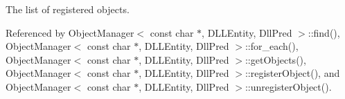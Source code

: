 The list of registered objects. 



Referenced by ObjectManager$<$ const char $\ast$, DLLEntity, DllPred $>$::find(), ObjectManager$<$ const char $\ast$, DLLEntity, DllPred $>$::for\_\-each(), ObjectManager$<$ const char $\ast$, DLLEntity, DllPred $>$::getObjects(), ObjectManager$<$ const char $\ast$, DLLEntity, DllPred $>$::registerObject(), and ObjectManager$<$ const char $\ast$, DLLEntity, DllPred $>$::unregisterObject().

